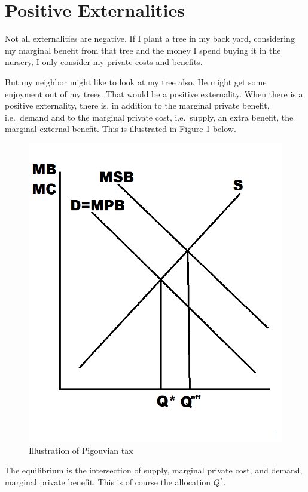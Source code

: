 \documentclass[
]{book}
\begin{document}
\hypertarget{positive-externalities}{%
\section{Positive Externalities}\label{positive-externalities}}

Not all externalities are negative. If I plant a tree in my back yard, considering my marginal benefit from that tree and the money I spend buying it in the nursery, I only consider my private costs and benefits.

But my neighbor might like to look at my tree also. He might get some enjoyment out of my trees. That would be a positive externality. When there is a positive externality, there is, in addition to the marginal private benefit, i.e.~demand and to the marginal private cost, i.e.~supply, an extra benefit, the marginal external benefit. This is illustrated in Figure \ref{fig:extfig3} below.

\begin{figure}

{\centering \includegraphics[width=0.75\linewidth]{img/externalities/extfig3} 

}

\caption{Illustration of Pigouvian tax}\label{fig:extfig3}
\end{figure}

The equilibrium is the intersection of supply, marginal private cost, and demand, marginal private benefit. This is of course the allocation \(Q^*\).
\end{document}
